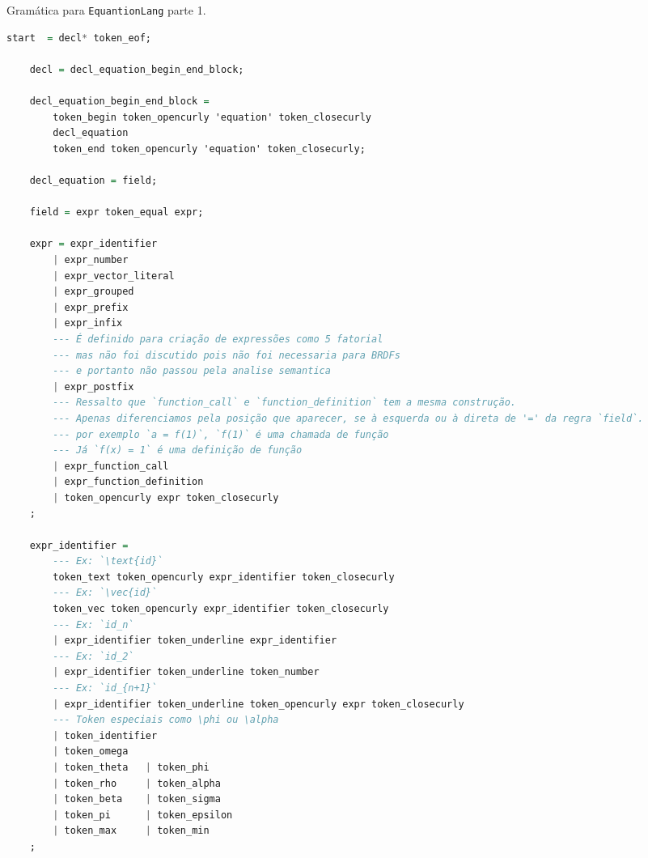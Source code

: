 \begin{codigo}[H]
        \caption{\small Gramática para \texttt{EquantionLang} parte 1.}
        \label{grammar-ast-pt1}
\begin{lstlisting}[language=haskell, numbers=none, inputencoding=utf8]
    start  = decl* token_eof;

    decl = decl_equation_begin_end_block;

    decl_equation_begin_end_block =
        token_begin token_opencurly 'equation' token_closecurly
        decl_equation
        token_end token_opencurly 'equation' token_closecurly;

    decl_equation = field;

    field = expr token_equal expr;

    expr = expr_identifier
        | expr_number
        | expr_vector_literal
        | expr_grouped
        | expr_prefix
        | expr_infix
        --- É definido para criação de expressões como 5 fatorial
        --- mas não foi discutido pois não foi necessaria para BRDFs
        --- e portanto não passou pela analise semantica
        | expr_postfix
        --- Ressalto que `function_call` e `function_definition` tem a mesma construção.
        --- Apenas diferenciamos pela posição que aparecer, se à esquerda ou à direta de '=' da regra `field`.
        --- por exemplo `a = f(1)`, `f(1)` é uma chamada de função
        --- Já `f(x) = 1` é uma definição de função
        | expr_function_call
        | expr_function_definition
        | token_opencurly expr token_closecurly
    ;

    expr_identifier =
        --- Ex: `\text{id}`
        token_text token_opencurly expr_identifier token_closecurly
        --- Ex: `\vec{id}`
        token_vec token_opencurly expr_identifier token_closecurly
        --- Ex: `id_n`
        | expr_identifier token_underline expr_identifier
        --- Ex: `id_2`
        | expr_identifier token_underline token_number
        --- Ex: `id_{n+1}`
        | expr_identifier token_underline token_opencurly expr token_closecurly
        --- Token especiais como \phi ou \alpha
        | token_identifier
        | token_omega
        | token_theta   | token_phi
        | token_rho     | token_alpha
        | token_beta    | token_sigma
        | token_pi      | token_epsilon
        | token_max     | token_min
    ;

\end{lstlisting}
\end{codigo}

